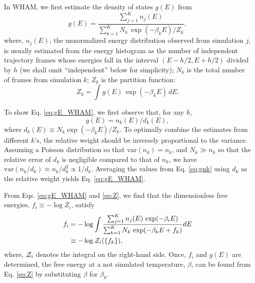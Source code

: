 \documentclass[reprint,aip,jcp,superscriptaddress]{revtex4-1}
\begin{document}
In WHAM,
we first estimate the density of states $g(E)$ from
%
\begin{equation}
g(E)
=
\frac{
  \sum_{j = 1}^K n_j(E)
}
{
  \sum_{k = 1}^K N_k \, \exp(-\beta_k E) / Z_k
},
\label{eq:gE_WHAM}
\end{equation}
%
where,
$n_j(E)$,
the unnormalized energy distribution
observed from simulation $j$,
is usually estimated
from the energy histogram as
the number of independent trajectory frames
whose energies fall in the interval
$(E - h/2, E + h/2)$
divided by $h$
(we shall omit ``independent'' below for simplicity);
%
$N_k$
is the total number of frames
from simulation $k$;
%
$Z_k$
is the partition function:
%
\begin{equation}
Z_k
=
\int g(E) \, \exp(-\beta_k E) \, dE.
\label{eq:Z}
\end{equation}



To show Eq. \eqref{eq:gE_WHAM},
we first observe that, for any $k$,
\begin{equation}
  g(E) = n_k(E) / d_k(E),
  \label{eq:gnk}
\end{equation}
where $d_k(E) \equiv N_k \exp(-\beta_k E)/Z_k$.
%
To optimally combine the estimates from different $k$'s,
the relative weight should be inversely
proportional to the variance\cite{
newman, *frenkel}.
%
Assuming a Poisson distribution
so that $\mathrm{var}(n_k) = n_k$,
and $N_k \gg n_k$ so that
the relative error of $d_k$ is negligible
compared to that of $n_k$,
we have
$\mathrm{var}(n_k/d_k) \approx n_k / d_k^2 \propto 1/d_k$.
%
Averaging the values from Eq. \eqref{eq:gnk}
using $d_k$ as the relative weight yields
Eq. \eqref{eq:gE_WHAM}.



From Eqs. \eqref{eq:gE_WHAM} and \eqref{eq:Z},
we find that the dimensionless free energies,
$f_i \equiv -\log Z_i$,
satisfy
\begin{align}
f_i
&=
-\log
  \int
    \frac{
      \sum_{j = 1}^K n_j(E) \, \exp(-\beta_i E)
    }
    {
      \sum_{k = 1}^K N_k \, \exp(-\beta_k E + f_k)
    }
    dE
\label{eq:f_WHAM}
\\
&\equiv
-\log \mathcal{Z}_i(\{ f_k \}),
\notag
\end{align}
%
where,
$\mathcal{Z}_i$
denotes the integral on the right-hand side.
%
Once, $f_i$ and $g(E)$ are determined,
the free energy at a not simulated temperature, $\beta$,
can be found from Eq. \eqref{eq:Z}
by substituting $\beta$ for $\beta_k$.
\end{document}
